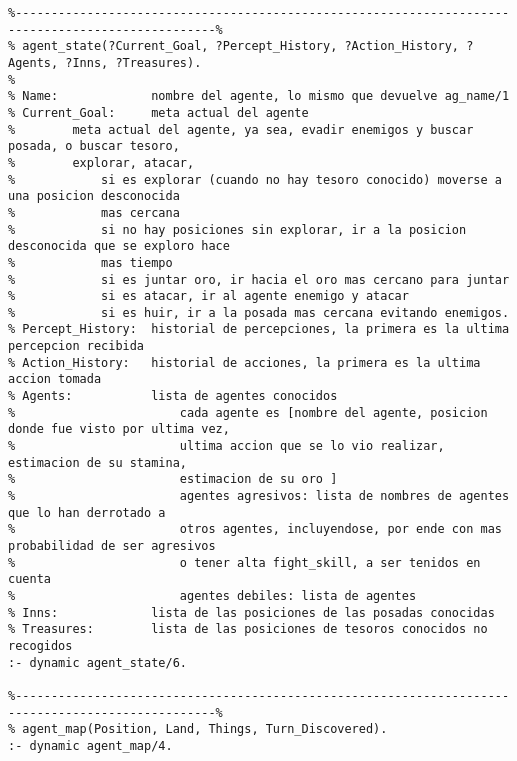 \documentclass[a4paper,12pt]{report}
\begin{document}
\begin{scriptsize}
\begin{verbatim}
%--------------------------------------------------------------------------------------------------%
% agent_state(?Current_Goal, ?Percept_History, ?Action_History, ?Agents, ?Inns, ?Treasures).
%
% Name:             nombre del agente, lo mismo que devuelve ag_name/1
% Current_Goal:     meta actual del agente
%        meta actual del agente, ya sea, evadir enemigos y buscar posada, o buscar tesoro, 
%        explorar, atacar, 
%            si es explorar (cuando no hay tesoro conocido) moverse a una posicion desconocida 
%            mas cercana
%            si no hay posiciones sin explorar, ir a la posicion desconocida que se exploro hace 
%            mas tiempo
%            si es juntar oro, ir hacia el oro mas cercano para juntar
%            si es atacar, ir al agente enemigo y atacar
%            si es huir, ir a la posada mas cercana evitando enemigos. 
% Percept_History:  historial de percepciones, la primera es la ultima percepcion recibida
% Action_History:   historial de acciones, la primera es la ultima accion tomada
% Agents:           lista de agentes conocidos
%                       cada agente es [nombre del agente, posicion donde fue visto por ultima vez, 
%                       ultima accion que se lo vio realizar, estimacion de su stamina, 
%                       estimacion de su oro ]
%                       agentes agresivos: lista de nombres de agentes que lo han derrotado a 
%                       otros agentes, incluyendose, por ende con mas probabilidad de ser agresivos 
%                       o tener alta fight_skill, a ser tenidos en cuenta
%                       agentes debiles: lista de agentes 
% Inns:             lista de las posiciones de las posadas conocidas
% Treasures:        lista de las posiciones de tesoros conocidos no recogidos
:- dynamic agent_state/6.

%--------------------------------------------------------------------------------------------------%
% agent_map(Position, Land, Things, Turn_Discovered).
:- dynamic agent_map/4.


\end{verbatim}
\end{scriptsize}
\end{document}

